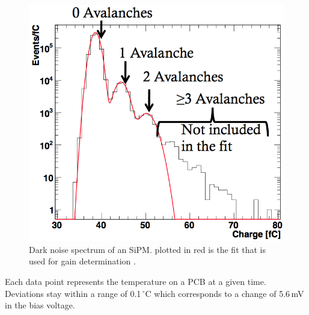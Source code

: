 \begin{figure}[htbp]
\begin{minipage}[t]{0.455\textwidth}
\includegraphics[width=\textwidth]{Figures/kuensken/gainDetermination.png}
\caption{Dark noise spectrum of an SiPM. plotted in red is the fit that is used for gain determination \cite{kuenskenCalor}.}
\label{kuenskendarkNoise}
\end{minipage}
\end{figure}
Each data point represents the temperature on a PCB at a given time. Deviations stay within a range of 0.1\,$^\circ$C which corresponds to a change of 5.6\,mV in the bias voltage.

